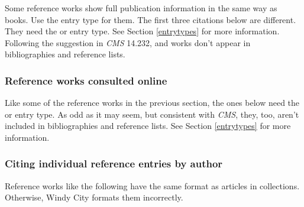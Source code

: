 \documentclass[11pt,letterpaper,oneside]{article}
\begin{document}
Some reference works show full publication information in the same way
as books. Use the  entry type for them. The first three
citations below are different. They need the  or
 entry type. See Section \ref{entrytypes} for
more information. Following the suggestion in \textit{CMS} 14.232,
 and  works don't appear in
bibliographies and reference lists.

\begin{citebib}
\item \cite{salvation1980}
\item \cite{hootananny2009}
\item \cite{dab1937}
\item \cite[s.vv. \mkbibquote{police ranks}, \mkbibquote{postal addresses}]{timestyle2003}
\item \cite[6.8.2]{mla2008}
\end{citebib}

\subsubsection{Reference works consulted online}

Like some of the reference works in the previous section, the ones
below need the  or  entry
type. As odd as it may seem, but consistent with \textit{CMS}, they,
too, aren't included in bibliographies and reference lists. See
Section \ref{entrytypes} for more information.

\begin{citeonly}
\item \cite{toscanini2016}
\item \cite{cairns2016}
\item \cite{wikipedia2016}
\item \cite{merriam2016}
\end{citeonly}

\subsubsection{Citing individual reference entries by author}

Reference works like the following have the same format as articles in
collections. Otherwise, Windy City formats them incorrectly.

\begin{citebib}
\item \cite{isaacson2005}
\end{citebib}
\end{document}
